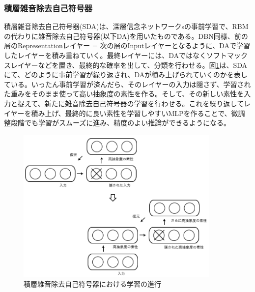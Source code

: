 \subsubsection{積層雑音除去自己符号器}
積層雑音除去自己符号器(SDA)は、深層信念ネットワークsの事前学習で、RBMの代わりに雑音除去自己符号器(以下DA)を用いたものである。DBN同様、前の層のRepresentationレイヤー = 次の層のInputレイヤーとなるように、DAで学習したレイヤーを積み重ねていく。最終レイヤーには、DAではなくソフトマックスレイヤーなどを置き、最終的な確率を出して、分類を行わせる。図\ref{c3_sda}は、SDAにて、どのように事前学習が繰り返され、DAが積み上げられていくのかを表している。いったん事前学習が済んだら、そのレイヤーの入力は隠さず、学習された重みをそのまま使って高い抽象度の素性を作る。そして、その新しい素性を入力と捉えて、新たに雑音除去自己符号器の学習を行わせる。これを繰り返してレイヤーを積み上げ、最終的に良い素性を学習しやすいMLPを作ることで、微調整段階でも学習がスムーズに進み、精度のよい推論ができるようになる。
\begin{figure}[tbp]
 \centering
  \includegraphics[width=100mm]{img/c3/sda}
 \caption{積層雑音除去自己符号器における学習の進行}
 \label{c3_sda}
\end{figure}



